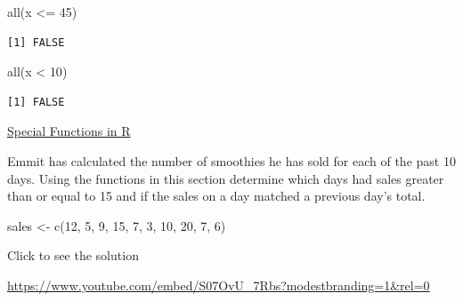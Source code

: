 \documentclass[
  letterpaper,
  DIV=11,
  numbers=noendperiod]{scrreprt}
\newenvironment{Shaded}{\begin{snugshade}}{\end{snugshade}}
\newcommand{\DecValTok}[1]{\textcolor[rgb]{0.68,0.00,0.00}{#1}}
\newcommand{\FunctionTok}[1]{\textcolor[rgb]{0.28,0.35,0.67}{#1}}
\newcommand{\NormalTok}[1]{\textcolor[rgb]{0.00,0.23,0.31}{#1}}
\newcommand{\OtherTok}[1]{\textcolor[rgb]{0.00,0.23,0.31}{#1}}
\newcommand{\SpecialCharTok}[1]{\textcolor[rgb]{0.37,0.37,0.37}{#1}}
\begin{document}
\begin{Shaded}
\begin{Highlighting}[]
\FunctionTok{all}\NormalTok{(x }\SpecialCharTok{\textless{}=} \DecValTok{45}\NormalTok{)}
\end{Highlighting}
\end{Shaded}

\begin{verbatim}
[1] FALSE
\end{verbatim}

\begin{Shaded}
\begin{Highlighting}[]
\FunctionTok{all}\NormalTok{(x }\SpecialCharTok{\textless{}} \DecValTok{10}\NormalTok{)}
\end{Highlighting}
\end{Shaded}

\begin{verbatim}
[1] FALSE
\end{verbatim}

\begin{watch}{}{}
    \href{https://youtu.be/46XJpsU2A6k}{Special Functions in R}
\end{watch}

\begin{tcolorbox}[enhanced jigsaw, colbacktitle=quarto-callout-tip-color!10!white, breakable, bottomrule=.15mm, colframe=quarto-callout-tip-color-frame, left=2mm, opacitybacktitle=0.6, title=\textcolor{quarto-callout-tip-color}{\faLightbulb}\hspace{0.5em}{Try it Out}, leftrule=.75mm, opacityback=0, rightrule=.15mm, titlerule=0mm, bottomtitle=1mm, colback=white, toprule=.15mm, arc=.35mm, toptitle=1mm, coltitle=black]

Emmit has calculated the number of smoothies he has sold for each of the
past 10 days. Using the functions in this section determine which days
had sales greater than or equal to 15 and if the sales on a day matched
a previous day's total.

\begin{Shaded}
\begin{Highlighting}[]
\NormalTok{sales }\OtherTok{\textless{}{-}} \FunctionTok{c}\NormalTok{(}\DecValTok{12}\NormalTok{, }\DecValTok{5}\NormalTok{, }\DecValTok{9}\NormalTok{, }\DecValTok{15}\NormalTok{, }\DecValTok{7}\NormalTok{, }\DecValTok{3}\NormalTok{, }\DecValTok{10}\NormalTok{, }\DecValTok{20}\NormalTok{, }\DecValTok{7}\NormalTok{, }\DecValTok{6}\NormalTok{)}
\end{Highlighting}
\end{Shaded}

Click to see the solution

\url{https://www.youtube.com/embed/S07OvU_7Rbs?modestbranding=1&rel=0}

\end{tcolorbox}
\end{document}
